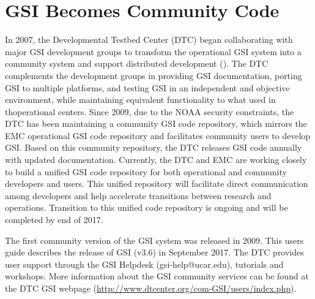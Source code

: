 \section{GSI Becomes Community Code}

In 2007, the Developmental Testbed Center (DTC) began collaborating with major GSI development groups to transform the operational GSI system into a community system and support distributed development (\cite{Shao2016}). The DTC complements the development groups in providing GSI documentation, porting GSI to multiple platforms, and testing GSI in an independent and objective environment, while maintaining equivalent functionality to what used in thoperational centers. Since 2009, due to the NOAA security constraints, the DTC has been maintaining a community GSI code repository, which mirrors the EMC operational GSI code repository and facilitates community users to develop GSI. Based on this community repository, the DTC releases GSI code annually with updated documentation. Currently, the DTC and EMC are working closely to build a unified GSI code repository for both operational and community developers and users. This unified repository will facilitate direct communication among developers and help accelerate transitions between research and operations. Transition to this unified code repository is ongoing and will be completed by end of 2017. 

The first community version of the GSI system was released in 2009. This user\textquotesingle s guide describes the release of GSI (v3.6) in September 2017. The DTC provides user support through the GSI Helpdesk (gsi-help@ucar.edu), tutorials and workshops. More information about the GSI community services can be found at the DTC GSI webpage (\url{http://www.dtcenter.org/com-GSI/users/index.php}).

